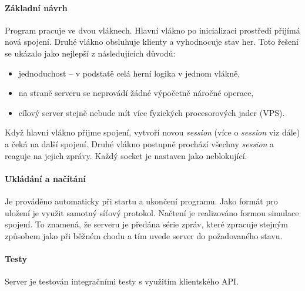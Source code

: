 \documentclass[12pt, a4paper]{report}
\begin{document}
\paragraph{Základní návrh}
Program pracuje ve dvou vláknech. Hlavní vlákno po inicializaci prostředí přijímá nová spojení. Druhé vlákno obsluhuje klienty a vyhodnocuje stav her. Toto řešení se ukázalo jako nejlepší z následujících důvodů:
\begin{itemize}
	\item jednoduchost -- v podstatě celá herní logika v jednom vlákně,
	\item na straně serveru se neprovádí žádné výpočetně náročné operace,
	\item cílový server stejně nebude mít více fyzických procesorových jader (VPS).
\end{itemize}
Když hlavní vlákno přijme spojení, vytvoří novou \emph{session} (více o \emph{session} viz dále) a čeká na další spojení. Druhé vlákno postupně prochází všechny \emph{session} a reaguje na jejich zprávy. Každý socket je nastaven jako neblokující.

\paragraph{Ukládání a načítání}
Je prováděno automaticky při startu a ukončení programu. Jako formát pro uložení je využit samotný síťový protokol. Načtení je realizováno formou simulace spojení. To znamená, že serveru je předána série zpráv, které zpracuje stejným způsobem jako při běžném chodu a tím uvede server do požadovaného stavu.

\paragraph{Testy}
Server je testován integračními testy s využitím klientského API.
\end{document}

